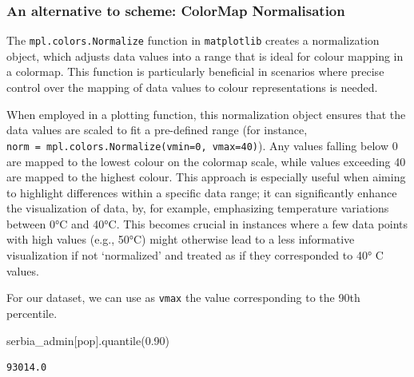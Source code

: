 \documentclass[
  letterpaper,
  DIV=11,
  numbers=noendperiod]{scrreprt}
\newenvironment{Shaded}{\begin{snugshade}}{\end{snugshade}}
\newcommand{\FloatTok}[1]{\textcolor[rgb]{0.68,0.00,0.00}{#1}}
\newcommand{\NormalTok}[1]{\textcolor[rgb]{0.00,0.23,0.31}{#1}}
\newcommand{\StringTok}[1]{\textcolor[rgb]{0.13,0.47,0.30}{#1}}
\begin{document}
\hypertarget{an-alternative-to-scheme-colormap-normalisation}{%
\subsubsection{An alternative to scheme: ColorMap
Normalisation}\label{an-alternative-to-scheme-colormap-normalisation}}

The \texttt{mpl.colors.Normalize} function in \texttt{matplotlib}
creates a normalization object, which adjusts data values into a range
that is ideal for colour mapping in a colormap. This function is
particularly beneficial in scenarios where precise control over the
mapping of data values to colour representations is needed.

When employed in a plotting function, this normalization object ensures
that the data values are scaled to fit a pre-defined range (for
instance, \texttt{norm\ =\ mpl.colors.Normalize(vmin=0,\ vmax=40)}). Any
values falling below 0 are mapped to the lowest colour on the colormap
scale, while values exceeding 40 are mapped to the highest colour. This
approach is especially useful when aiming to highlight differences
within a specific data range; it can significantly enhance the
visualization of data, by, for example, emphasizing temperature
variations between 0°C and 40°C. This becomes crucial in instances where
a few data points with high values (e.g., 50°C) might otherwise lead to
a less informative visualization if not `normalized' and treated as if
they corresponded to 40° C values.

For our dataset, we can use as \texttt{vmax} the value corresponding to
the 90th percentile.

\begin{Shaded}
\begin{Highlighting}[]
\NormalTok{serbia\_admin[}\StringTok{\textquotesingle{}pop\textquotesingle{}}\NormalTok{].quantile(}\FloatTok{0.90}\NormalTok{)}
\end{Highlighting}
\end{Shaded}

\begin{verbatim}
93014.0
\end{verbatim}
\end{document}
